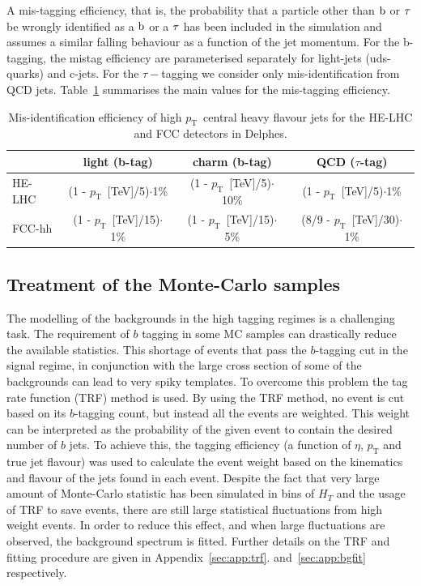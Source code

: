 \documentclass[a4paper,11pt]{article}
\newcommand{\pt}{\ensuremath{p_{\text{T}}}}
\newcommand*{\hht}{\ensuremath{H_{\ensuremath{T}}}}
\begin{document}
A mis-tagging efficiency, that is, the probability that a particle other than $\rm{b}$ or $\rm{\tau}$ be wrongly identified as a $\rm{b}$ or a $\rm{\tau}$ has been included in the simulation and assumes a similar falling behaviour as a function of the jet momentum. For the b-tagging, the mistag efficiency are parameterised separately for light-jets (uds-quarks) and c-jets. For the $\tau-$tagging we consider only mis-identification from QCD jets. Table~\ref{tab:mistag} summarises the main values for the mis-tagging efficiency.

\begin {table}[htb!]
\begin{center}
\begin{tabular}{ l | c | c | c }
  & light (b-tag) & charm (b-tag) & QCD ($\tau$-tag)\\
  \hline
  \hline
HE-LHC & (1 - \pt~[TeV]/5)$\cdot$1\%  & (1 - \pt~[TeV]/5)$\cdot$10\% & (1 - \pt~[TeV]/5)$\cdot$1\%  \\
FCC-hh & (1 - \pt~[TeV]/15)$\cdot$1\% & (1 - \pt~[TeV]/15)$\cdot$5\% & (8/9 - \pt~[TeV]/30)$\cdot$1\% \\
\end{tabular}
\caption{Mis-identification efficiency of high \pt\ central heavy flavour jets for the HE-LHC and FCC detectors in Delphes.}
\label{tab:mistag}
\end{center}
\end{table}



\subsection{Treatment of the Monte-Carlo samples}
\label{subsec:mctreat}
The modelling of the backgrounds in the high tagging regimes is a challenging task. The requirement of $b$ tagging in some MC samples can drastically reduce the available statistics. This shortage of events that pass the $b$-tagging cut in the signal regime, in conjunction with the large cross section of some of the backgrounds can lead to very spiky templates. To overcome this problem the tag rate function (TRF) method is used. By using the TRF method, no event is cut based on its $b$-tagging count, but instead all the events are weighted. This weight can be interpreted as the probability of the given event to contain the desired number of $b$ jets. To achieve this, the tagging efficiency (a function of $\eta$, $\pt$ and true jet flavour) was used to calculate the event weight based on the kinematics and flavour of the jets found in each event. 
Despite the fact that very large amount of Monte-Carlo statistic has been simulated in bins of $\hht$ and the usage of TRF to save events, there are still large statistical fluctuations from high weight events. In order to reduce this effect, and when large fluctuations are observed, the background spectrum is fitted. Further details on the TRF and fitting procedure are given in Appendix~\ref{sec:app:trf}.
and~\ref{sec:app:bgfit} respectively.
\end{document}
